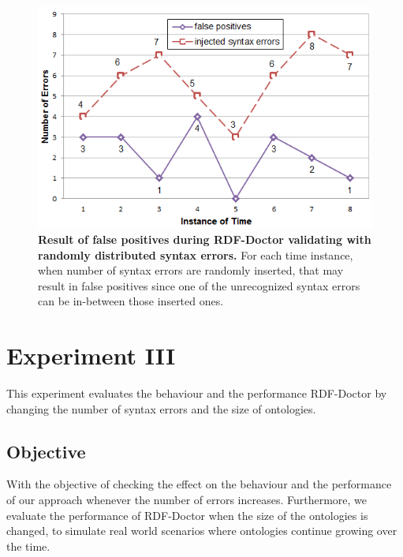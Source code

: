 \begin{figure}[ht]
	\begin{center}
		\includegraphics[scale=0.7,angle=0]{images/Experiment02-03.png}
				\setlength\belowcaptionskip{-5mm}
		\caption{\textbf{Result of false positives during RDF-Doctor validating with randomly distributed syntax errors.} 
		For each time instance, when number of syntax errors are randomly inserted, that may result in false positives since one of the unrecognized syntax errors can be in-between those inserted ones.} 
		\label{Fig:Experiment02-03}
				\setlength\belowcaptionskip{-5mm}
		\setlength\abovecaptionskip{0mm}
	\end{center}
\end{figure}
 


\section{Experiment III}

This experiment evaluates the behaviour and the performance RDF-Doctor by changing the number of syntax errors and the size of ontologies. 

\subsection{Objective}
With the objective of checking the effect on the behaviour and the performance of our approach whenever the number of errors increases.
Furthermore, we evaluate the performance of RDF-Doctor when the size of the ontologies is changed, to simulate real world scenarios where ontologies continue growing over the time.


